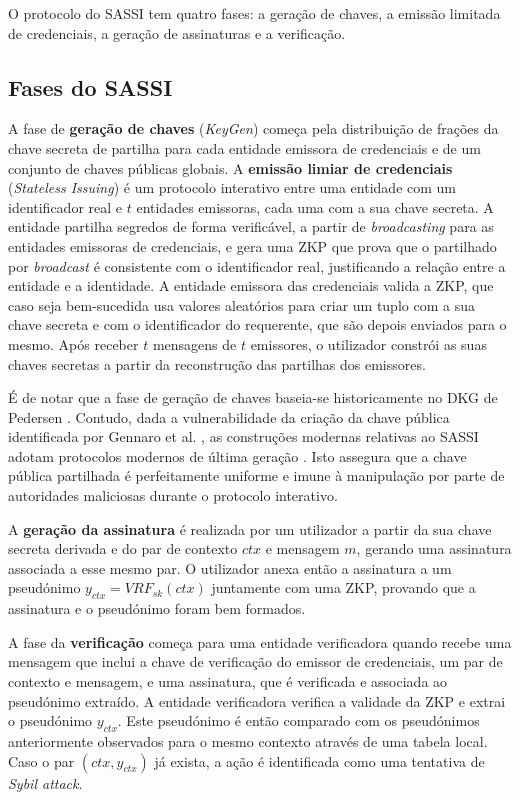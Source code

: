 O protocolo do SASSI tem quatro fases: a geração de chaves, a emissão limitada de credenciais, a geração de assinaturas e a verificação.

\subsection{Fases do SASSI}

A fase de \textbf{geração de chaves} (\textit{KeyGen}) começa pela distribuição de frações da chave secreta de partilha para cada entidade emissora de credenciais e de um conjunto de chaves públicas globais. A \textbf{emissão limiar de credenciais} (\textit{Stateless Issuing}) é um protocolo interativo entre uma entidade com um identificador real e $t$ entidades emissoras, cada uma com a sua chave secreta. A entidade partilha segredos de forma verificável, a partir de \textit{broadcasting} para as entidades emissoras de credenciais, e gera uma ZKP que prova que o partilhado por \textit{broadcast} é consistente com o identificador real, justificando a relação entre a entidade e a identidade. A entidade emissora das credenciais valida a ZKP, que caso seja bem-sucedida usa valores aleatórios para criar um tuplo com a sua chave secreta e com o identificador do requerente, que são depois enviados para o mesmo. Após receber $t$ mensagens de $t$ emissores, o utilizador constrói as suas chaves secretas a partir da reconstrução das partilhas dos emissores.

É de notar que a fase de geração de chaves baseia-se historicamente no DKG de Pedersen \cite{gennaro2007secure}. Contudo, dada a vulnerabilidade da criação da chave pública identificada por Gennaro et al. \cite{gennaro2007secure}, as construções modernas relativas ao SASSI adotam protocolos modernos de última geração \cite{katz2024roundoptimal}. Isto assegura que a chave pública partilhada é perfeitamente uniforme e imune à manipulação por parte de autoridades maliciosas durante o protocolo interativo.

A \textbf{geração da assinatura} é realizada por um utilizador a partir da sua chave secreta derivada e do par de contexto $ctx$ e mensagem $m$, gerando uma assinatura associada a esse mesmo par. O utilizador anexa então a assinatura a um pseudónimo $y_{ctx} = VRF_{sk}(ctx)$ juntamente com uma ZKP, provando que a assinatura e o pseudónimo foram bem formados.

A fase da \textbf{verificação} começa para uma entidade verificadora quando recebe uma mensagem que inclui a chave de verificação do emissor de credenciais, um par de contexto e mensagem, e uma assinatura, que é verificada e associada ao pseudónimo extraído. A entidade verificadora verifica a validade da ZKP e extrai o pseudónimo $y_{ctx}$. Este pseudónimo é então comparado com os pseudónimos anteriormente observados para o mesmo contexto através de uma tabela local. Caso o par $(ctx, y_{ctx})$ já exista, a ação é identificada como uma tentativa de \textit{Sybil attack}.

